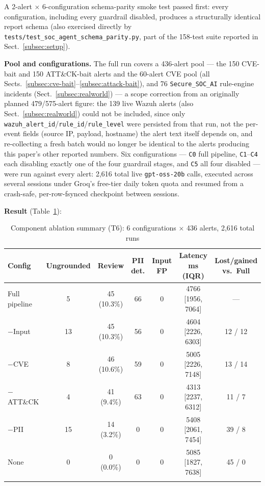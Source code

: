 \documentclass[pdflatex,sn-mathphys-num]{sn-jnl}%
\begin{document}
A 2-alert $\times$ 6-configuration schema-parity smoke test passed
first: every configuration, including every guardrail disabled, produces
a structurally identical report schema (also exercised directly by
\texttt{tests/test\_soc\_agent\_schema\_parity.py}, part of the 158-test
suite reported in Sect.~\ref{subsec:setup}).

\textbf{Pool and configurations.} The full run covers a 436-alert pool
--- the 150 CVE-bait and 150 ATT\&CK-bait alerts and the 60-alert CVE
pool (all Sects.~\ref{subsec:cve-bait}--\ref{subsec:attack-bait}), and 76
\texttt{Secure\_SOC\_AI}
rule-engine incidents (Sect.~\ref{subsec:realworld}) --- a scope
correction from an originally planned 479/575-alert figure: the 139 live
Wazuh alerts (also Sect.~\ref{subsec:realworld}) could not be included,
since only \texttt{wazuh\_alert\_id}/\texttt{rule\_id}/\texttt{rule\_level}
were persisted from that run, not the per-event fields (source IP,
payload, hostname) the alert text itself depends on, and re-collecting a
fresh batch would no longer be identical to the alerts producing this
paper's other reported numbers. Six configurations --- \texttt{C0} full
pipeline, \texttt{C1}--\texttt{C4} each disabling exactly one of the four
guardrail stages, and \texttt{C5} all four disabled --- were run against
every alert: 2{,}616 total live \texttt{gpt-oss-20b} calls, executed
across several sessions under Groq's free-tier daily token quota and
resumed from a crash-safe, per-row-fsynced checkpoint between sessions.

\textbf{Result} (Table~\ref{tab:ablation}):

\begin{table}[h]
\caption{Component ablation summary (T6): 6 configurations $\times$ 436 alerts, 2{,}616 total runs}\label{tab:ablation}
\begin{tabular}{@{}lcccccc@{}}
\toprule
Config & Ungrounded & Review & PII det. & Input FP & Latency ms (IQR) & Lost/gained vs.\ Full \\
\midrule
Full pipeline & 5 & 45 (10.3\%) & 66 & 0 & 4766 [1956, 7064] & --- \\
$-$Input & 13 & 45 (10.3\%) & 56 & 0 & 4604 [2226, 6303] & 12 / 12 \\
$-$CVE & 8 & 46 (10.6\%) & 59 & 0 & 5005 [2226, 7148] & 13 / 14 \\
$-$ATT\&CK & 4 & 41 (9.4\%) & 63 & 0 & 4313 [2237, 6312] & 11 / 7 \\
$-$PII & 15 & 14 (3.2\%) & 0 & 0 & 5408 [2061, 7454] & 39 / 8 \\
None & 0 & 0 (0.0\%) & 0 & 0 & 5085 [1827, 7638] & 45 / 0 \\
\botrule
\end{tabular}
\end{table}
\end{document}
